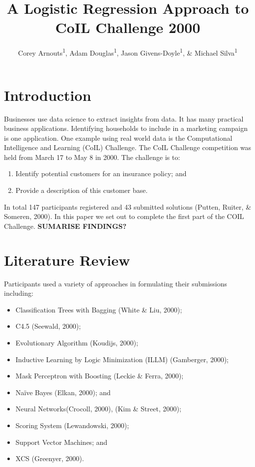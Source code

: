 \documentclass[man]{apa6}
\title{A Logistic Regression Approach to CoIL Challenge 2000}
\author{Corey Arnouts\textsuperscript{1}, Adam Douglas\textsuperscript{1}, Jason Givens-Doyle\textsuperscript{1}, \& Michael Silva\textsuperscript{1}}
\date{}
\affiliation{
\vspace{0.5cm}
\textsuperscript{1} MS in Data Science Students CUNY School of Professional Studies}
\begin{document}
\maketitle

\hypertarget{introduction}{%
\section{Introduction}\label{introduction}}

Businesses use data science to extract insights from data. It has many practical business applications. Identifying households to include in a marketing campaign is one application. One example using real world data is the Computational Intelligence and Learning (CoIL) Challenge. The CoIL Challenge competition was held from March 17 to May 8 in 2000. The challenge is to:

\begin{enumerate}
\def\labelenumi{\arabic{enumi}.}
\item
  Identify potential customers for an insurance policy; and
\item
  Provide a description of this customer base.
\end{enumerate}

In total 147 participants registered and 43 submitted solutions (Putten, Ruiter, \& Someren, 2000). In this paper we set out to complete the first part of the COIL Challenge. \textbf{SUMARISE FINDINGS?}

\hypertarget{literature-review}{%
\section{Literature Review}\label{literature-review}}

Participants used a variety of approaches in formulating their submissions including:

\begin{itemize}
\item
  Classification Trees with Bagging (White \& Liu, 2000);
\item
  C4.5 (Seewald, 2000);
\item
  Evolutionary Algorithm (Koudijs, 2000);
\item
  Inductive Learning by Logic Minimization (ILLM) (Gamberger, 2000);
\item
  Mask Perceptron with Boosting (Leckie \& Ferra, 2000);
\item
  Naïve Bayes (Elkan, 2000); and
\item
  Neural Networks(Crocoll, 2000), (Kim \& Street, 2000);
\item
  Scoring System (Lewandowski, 2000);
\item
  Support Vector Machines; and
\item
  XCS (Greenyer, 2000).
\end{itemize}
\end{document}
